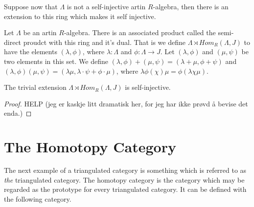     Suppose now that $\Lambda$ is not a self-injective artin $R$-algebra, then there is an extension to this ring which makes it self injective.

    \begin{definition}
        Let $\Lambda$ be an artin $R$-algebra. There is an associated product called the semi-direct proudct with this ring and it's dual. That is we define $\Lambda \rtimes Hom_R(\Lambda,J)$ to have the elements $(\lambda, \phi)$, where $\lambda:\Lambda$ and $\phi:\Lambda\rightarrow J$. Let $(\lambda, \phi)$ and $(\mu, \psi)$ be two elements in this set. We define $(\lambda, \phi) + (\mu, \psi) = (\lambda + \mu, \phi + \psi)$ and $(\lambda, \phi)(\mu, \psi) = (\lambda\mu, \lambda\cdot\psi + \phi\cdot\mu)$, where $\lambda\phi (\chi)\mu = \phi(\lambda\chi\mu)$.
    \end{definition}

    \begin{prop}
        The trivial extension $\Lambda\rtimes Hom_R(\Lambda,J)$ is self-injective.
    \end{prop}

    \begin{proof}
        HELP (jeg er kaskje litt dramatisk her, for jeg har ikke prøvd å bevise det enda.)
    \end{proof}

\section{The Homotopy Category}
    
    The next example of a triangulated category is something which is referred to as \emph{the} triangulated category. The homotopy category is the category which may be regarded as the prototype for every triangulated category. It can be defined with the following category.

